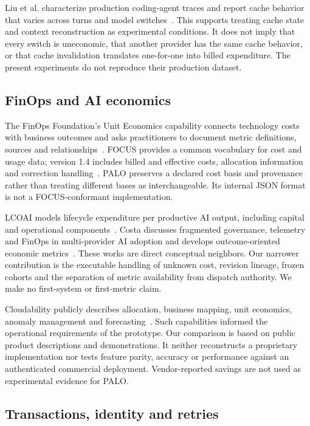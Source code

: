 \documentclass[10pt,twocolumn]{article}
\begin{document}
Liu et al. characterize production coding-agent traces and report cache behavior that varies across turns and model switches~\cite{copilot}. This supports treating cache state and context reconstruction as experimental conditions. It does not imply that every switch is uneconomic, that another provider has the same cache behavior, or that cache invalidation translates one-for-one into billed expenditure. The present experiments do not reproduce their production dataset.

\subsection{FinOps and AI economics}

The FinOps Foundation's Unit Economics capability connects technology costs with business outcomes and asks practitioners to document metric definitions, sources and relationships~\cite{uniteconomics}. FOCUS provides a common vocabulary for cost and usage data; version 1.4 includes billed and effective costs, allocation information and correction handling~\cite{focus}. PALO preserves a declared cost basis and provenance rather than treating different bases as interchangeable. Its internal JSON format is not a FOCUS-conformant implementation.

LCOAI models lifecycle expenditure per productive AI output, including capital and operational components~\cite{lcoai}. Costa discusses fragmented governance, telemetry and FinOps in multi-provider AI adoption and develops outcome-oriented economic metrics~\cite{multilab}. These works are direct conceptual neighbors. Our narrower contribution is the executable handling of unknown cost, revision lineage, frozen cohorts and the separation of metric availability from dispatch authority. We make no first-system or first-metric claim.

Cloudability publicly describes allocation, business mapping, unit economics, anomaly management and forecasting~\cite{cloudability}. Such capabilities informed the operational requirements of the prototype. Our comparison is based on public product descriptions and demonstrations. It neither reconstructs a proprietary implementation nor tests feature parity, accuracy or performance against an authenticated commercial deployment. Vendor-reported savings are not used as experimental evidence for PALO.

\subsection{Transactions, identity and retries}
\end{document}
